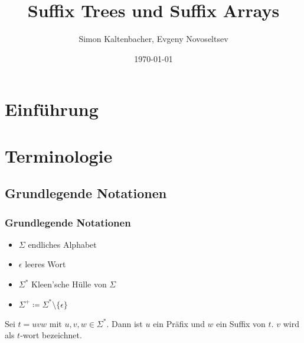 \documentclass{beamer}
\title{Suffix Trees und Suffix Arrays}
\author{Simon Kaltenbacher, Evgeny Novoseltsev}
\date{\today}
\begin{document}
\frame{\titlepage}


\section{Einführung}

\section{Terminologie}

\subsection{Grundlegende Notationen}

\begin{frame}
    \frametitle{Grundlegende Notationen}
    \begin{itemize}
         \item $\Sigma$ endliches Alphabet
         \item $\epsilon$ leeres Wort
         \item $\Sigma^*$ Kleen'sche Hülle von $\Sigma$
         \item $\Sigma^+ \coloneqq \Sigma^* \setminus \{\epsilon\}$ 
    \end{itemize}
    \begin{definition}
        Sei $t = uvw$ mit $u, v, w \in \Sigma^*$. Dann ist $u$ ein Präfix und $w$ ein Suffix von $t$. $v$ wird als $t$-wort bezeichnet.
    \end{definition}
\end{frame}

\end{document}
